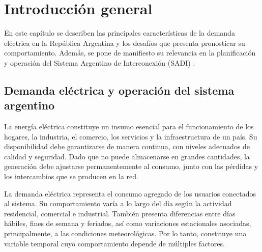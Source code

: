 
\chapter{Introducción general} %

\label{Chapter1} %
\label{IntroGeneral}

En este capítulo se describen las principales características de la demanda eléctrica en la República Argentina y los desafíos que presenta pronosticar su comportamiento. Además, se pone de manifiesto su relevancia en la planificación y operación del Sistema Argentino de Interconexión (SADI) \cite{ley24065}.


\newcommand{\keyword}[1]{\textbf{#1}}
\newcommand{\tabhead}[1]{\textbf{#1}}
\newcommand{\code}[1]{\texttt{#1}}
\newcommand{\file}[1]{\texttt{\bfseries#1}}
\newcommand{\option}[1]{\texttt{\itshape#1}}
\newcommand{\grados}{$^{\circ}$}





\section{Demanda eléctrica y operación del sistema argentino}
\label{sec:introduccion}

La energía eléctrica constituye un insumo esencial para el funcionamiento de los hogares, la industria, el comercio, los servicios y la infraestructura de un país. Su disponibilidad debe garantizarse de manera continua, con niveles adecuados de calidad y seguridad. Dado que no puede almacenarse en grandes cantidades, la generación debe ajustarse permanentemente al consumo, junto con las pérdidas y los intercambios que se producen en la red.

La demanda eléctrica representa el consumo agregado de los usuarios conectados al sistema. Su comportamiento varía a lo largo del día según la actividad residencial, comercial e industrial. También presenta diferencias entre días hábiles, fines de semana y feriados, así como variaciones estacionales asociadas, principalmente, a las condiciones meteorológicas. Por lo tanto, constituye una variable temporal cuyo comportamiento depende de múltiples factores.

